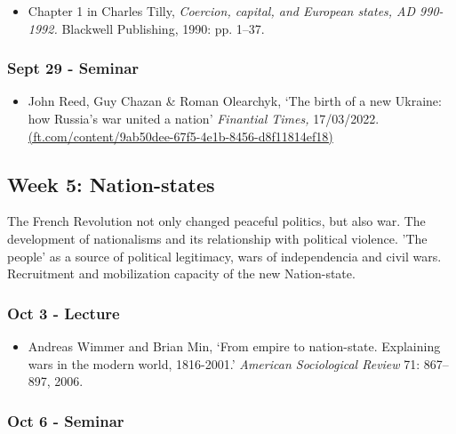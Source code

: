 \documentclass[12pt, a4paper]{article}
\begin{document}
\begin{itemize}
\setlength\itemsep{0pt}
\item Chapter 1 in Charles Tilly, \textit{Coercion, capital, and European states, AD 990-1992.} Blackwell Publishing, 1990: pp. 1--37.
\end{itemize}

\subsubsection*{Sept 29 - Seminar}

\begin{itemize}
\setlength\itemsep{0pt}
\item John Reed, Guy Chazan \& Roman Olearchyk, `The birth of a new Ukraine: how Russia's war united a nation' \textit{Finantial Times,} 17/03/2022. \href{https://www.ft.com/content/9ab50dee-67f5-4e1b-8456-d8f11814ef18}{(ft.com/content/9ab50dee-67f5-4e1b-8456-d8f11814ef18)}
\end{itemize}


\hline %

\subsection*{Week 5: Nation-states}

The French Revolution not only changed peaceful politics, but also war. The development of nationalisms and its relationship with political violence. 'The people' as a source of political legitimacy, wars of independencia and civil wars. Recruitment and mobilization capacity of the new Nation-state.

\subsubsection*{Oct 3 - Lecture}

\begin{itemize}
\setlength\itemsep{0pt}
\item Andreas Wimmer and Brian Min, `From empire to nation-state. Explaining wars in the modern world, 1816-2001.' \textit{American Sociological Review} 71: 867--897, 2006.
\end{itemize}

\subsubsection*{Oct 6 - Seminar}
\end{document}

